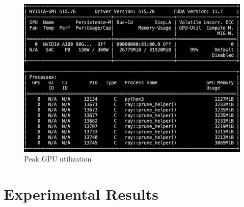 \documentclass{article}
\begin{document}
\begin{figure}
    \centerline{\includegraphics[width=6in]{../proj1/figures/nvidia-smi_pruning.png}}
    \caption{Peak GPU utilization}
    \label{fig:nvidiasmi}
\end{figure}

\section{Experimental Results}
\end{document}
